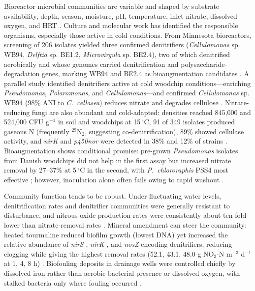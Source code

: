 \documentclass[11pt]{article}
\begin{document}
Bioreactor microbial communities are variable and shaped by substrate availability, depth, season, moisture, pH, temperature, inlet nitrate, dissolved oxygen, and HRT \parencite{Hartfiel2022}. Culture and molecular work has identified the responsible organisms, especially those active in cold conditions. From Minnesota bioreactors, screening of 206 isolates yielded three confirmed denitrifiers (\textit{Cellulomonas} sp. WB94, \textit{Delftia} sp. BE1.2, \textit{Microvirgula} sp. BE2.4), two of which denitrified aerobically and whose genomes carried denitrification and polysaccharide-degradation genes, marking WB94 and BE2.4 as bioaugmentation candidates \parencite{Anderson2020}. A parallel study identified denitrifiers active at cold woodchip conditions---enriching \textit{Pseudomonas}, \textit{Polaromonas}, and \textit{Cellulomonas}---and confirmed \textit{Cellulomonas} sp. WB94 (98\% ANI to \textit{C.\ cellasea}) reduces nitrate and degrades cellulose \parencite{Jang2019}. Nitrate-reducing fungi are also abundant and cold-adapted: densities reached 845,000 and 524,000 CFU g$^{-1}$ in soil and woodchips at 15\,$^{\circ}$C, 91 of 349 isolates produced gaseous N (frequently $^{29}$N$_2$, suggesting co-denitrification), 89\% showed cellulase activity, and \textit{nirK} and \textit{p450nor} were detected in 38\% and 12\% of strains \parencite{Aldossari2021}. Bioaugmentation shows conditional promise: pre-grown \textit{Pseudomonas} isolates from Danish woodchips did not help in the first assay but increased nitrate removal by 27--37\% at 5\,$^{\circ}$C in the second, with \textit{P.\ chlororaphis} PSS4 most effective \parencite{Jeglot2022}; however, inoculation alone often fails owing to rapid washout \parencite{Wang2025b}.

Community function tends to be robust. Under fluctuating water levels, denitrification rates and denitrifier communities were generally resistant to disturbance, and nitrous-oxide production rates were consistently about ten-fold lower than nitrate-removal rates \parencite{Hathaway2017}. Mineral amendment can steer the community: heated tourmaline reduced biofilm growth (lowest DNA) yet increased the relative abundance of \textit{nirS}-, \textit{nirK}-, and \textit{nosZ}-encoding denitrifiers, reducing clogging while giving the highest removal rates (52.1, 43.1, 48.0 g NO$_3$-N m$^{-3}$ d$^{-1}$ at 1, 4, 8 h) \parencite{Ma2021}. Biofouling deposits in drainage wells were controlled chiefly by dissolved iron rather than aerobic bacterial presence or dissolved oxygen, with stalked bacteria only where fouling occurred \parencite{Stuetz2004}.
\end{document}
